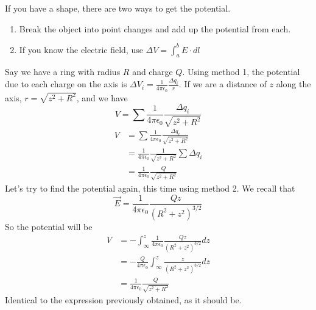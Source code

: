 \documentclass[nobib]{tufte-handout}
\begin{document}
If you have a shape, there are two ways to get the potential. 
\begin{enumerate}
    \item Break the object into point changes and add up the potential from each. 
    \item If you know the electric field, use $\Delta V = \int_{a}^{b} E \cdot dl$
\end{enumerate}
Say we have a ring with radius $R$ and charge $Q$. Using method 1, the potential due 
to each charge on the axis is $\Delta V_i = \frac{1}{4\pi \epsilon_0}\frac{\Delta q_i}{r}$.
If we are a distance of $z$ along the axis, $r = \sqrt{z^2+R^2}$, and we have 
\[V = \sum \frac{1}{4 \pi \epsilon_0}\frac{\Delta q_i}{\sqrt{z^2+R^2}}\]
\begin{align*}
    V &= \sum \frac{1}{4 \pi \epsilon_0}\frac{\Delta q_i}{\sqrt{z^2+R^2}} \\
    &= \frac{1}{4 \pi \epsilon_0}\frac{1}{\sqrt{z^2+R^2}} \sum \Delta q_i \\
    &= \frac{1}{4 \pi \epsilon_0}\frac{Q}{\sqrt{z^2+R^2}}
\end{align*}
Let's try to find the potential again, this time using method 2. 
We recall that 
\[\vec{E} = \frac{1}{4 \pi \epsilon_0}\frac{Qz}{(R^2+z^2)^{3/2}}\]
So the potential will be 
\begin{align*}
    V &= -\int_{\infty}^{z} \frac{1}{4 \pi \epsilon_0}\frac{Qz}{(R^2+z^2)^{3/2}} dz \\
    &= - \frac{Q}{4 \pi \epsilon_0}\int_{\infty}^{z}\frac{z}{(R^2+z^2)^{3/2}} dz \\
    &= \frac{1}{4 \pi \epsilon_0}\frac{Q}{\sqrt{z^2+R^2}}
\end{align*}
Identical to the expression previously obtained, as it should be.
\end{document}
